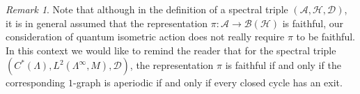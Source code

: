 \documentclass{amsart}
\theoremstyle{plain}
\theoremstyle{definition}
\theoremstyle{remark}
\newtheorem{remark}[subsection]{Remark}
\numberwithin{equation}{section}
\newcommand{\cal}{\mathcal}
\newcommand{\cla}{{\cal A}}
\newcommand{\clb}{{\cal B}}
\newcommand{\cld}{{\cal D}}
\newcommand{\clh}{{\cal H}}
\newcommand{\raro}{\rightarrow}
\begin{document}
\begin{remark}
    Note that although in the definition of a spectral triple $(\cla,\clh,\cld)$, it is in general assumed that the representation $\pi:\cla\raro\clb(\clh)$ is faithful, our consideration of quantum isometric action does not really require $\pi$ to be faithful. In this context we would like to remind the reader that for the spectral triple $(C^{\ast}(\Lambda),L^{2}(\Lambda^{\infty},M),\cld)$, the representation $\pi$ is faithful if and only if the corresponding $1$-graph is aperiodic if and only if every closed cycle has an exit. 
\end{remark}
\end{document}
